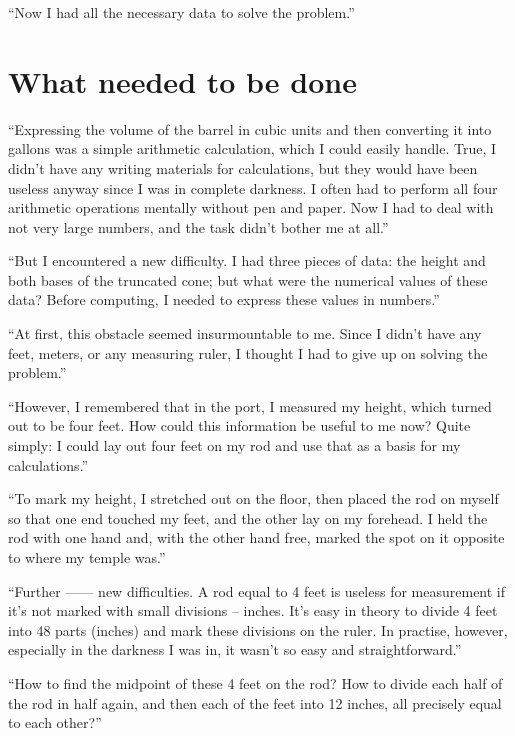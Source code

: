 ``Now I had all the necessary data to solve the problem.''

\section{What needed to be done}
\label{sec-8.4}

``Expressing the volume of the barrel in cubic units and then converting it into gallons was a simple arithmetic calculation, which I could easily handle. True, I didn't have any writing materials for calculations, but they would have been useless anyway since I was in complete darkness. I often had to perform all four arithmetic operations mentally without pen and paper. Now I had to deal with not very large numbers, and the task didn't bother me at all.''

``But I encountered a new difficulty. I had three pieces of data: the height and both bases of the truncated cone; but what were the numerical values of these data? Before computing, I needed to express these values in numbers.''

``At first, this obstacle seemed insurmountable to me. Since I didn't have any feet, meters, or any measuring ruler, I thought I had to give up on solving the problem.''

``However, I remembered that in the port, I measured my height, which turned out to be four feet. How could this information be useful to me now? Quite simply: I could lay out four feet on my rod and use that as a basis for my calculations.''

``To mark my height, I stretched out on the floor, then placed the rod on myself so that one end touched my feet, and the other lay on my forehead. I held the rod with one hand and, with the other hand free, marked the spot on it opposite to where my temple was.''

``Further —— new difficulties. A rod equal to 4 feet is useless for measurement if it's not marked with small divisions -- inches. It's easy in theory to divide 4 feet into 48 parts (inches) and mark these divisions on the ruler. In practise, however, especially in the darkness I was in, it wasn't so easy and straightforward.''

``How to find the midpoint of these 4 feet on the rod? How to divide each half of the rod in half again, and then each of the feet into 12 inches, all precisely equal to each other?''

